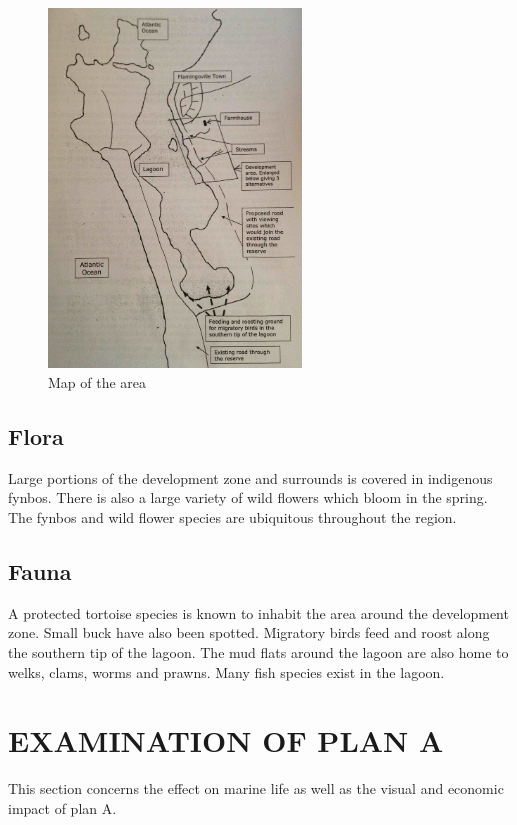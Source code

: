 \documentclass{article}
\begin{document}
\begin{figure}[h!]
	\centering
	\includegraphics[width=0.6\textwidth]{map}
	\caption{Map of the area}
\end{figure}

\subsection{Flora}
Large portions of the development zone and surrounds is covered in indigenous fynbos. There is also a large variety of wild flowers which bloom in the spring. The fynbos and wild flower species are ubiquitous throughout the region.

\subsection{Fauna}
A protected tortoise species is known to inhabit the area around the development zone. Small buck have also been spotted. Migratory birds feed and roost along the southern tip of the lagoon. The mud flats around the lagoon are also home to welks, clams, worms and prawns. Many fish species exist in the lagoon.

\newpage
\section{EXAMINATION OF PLAN A}
This section concerns the effect on marine life as well as the visual and economic impact of plan A.
\end{document}
